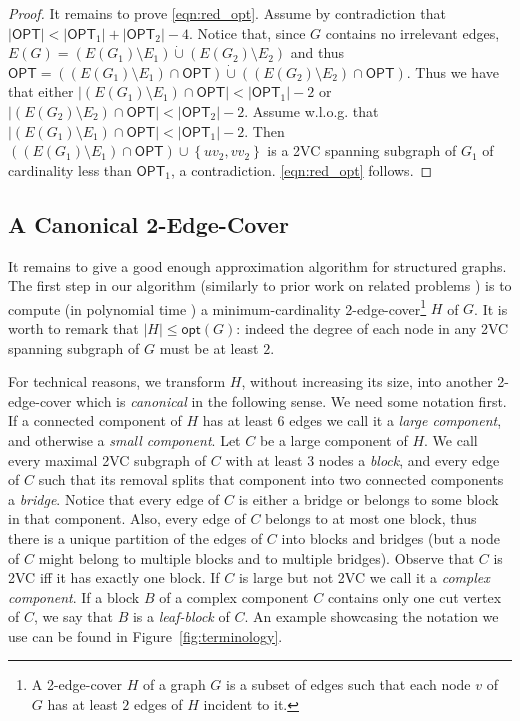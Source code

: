 \documentclass{article}
\newcommand{\OPT}{\mathsf{OPT}}
\newcommand{\opt}{\mathsf{opt}}
\newcommand{\set}[1]{\left\{#1 \right\}}
\begin{document}
\begin{proof}
It remains to prove \eqref{eqn:red_opt}. Assume by contradiction that $|\OPT|< |\OPT_1| + |\OPT_2| - 4$. Notice that, since $G$ contains no irrelevant edges, $E(G)=(E(G_1)\setminus E_1)\dot\cup (E(G_2)\setminus E_2)$ and thus $\OPT=((E(G_1)\setminus E_1)\cap \OPT)\dot\cup((E(G_2)\setminus E_2)\cap\OPT)$. Thus we have that either $|(E(G_1)\setminus E_1)\cap\OPT|<|\OPT_1|-2$ or $|(E(G_2)\setminus E_2)\cap\OPT|<|\OPT_2|-2$. Assume w.l.o.g. that $|(E(G_1)\setminus E_1)\cap\OPT|<|\OPT_1|-2$. Then $((E(G_1)\setminus E_1)\cap\OPT)\cup\set{uv_2,vv_2}$ is a 2VC spanning subgraph of $G_1$ of cardinality less than $\OPT_1$, a contradiction. \eqref{eqn:red_opt} follows.
\end{proof}

\subsection{A Canonical 2-Edge-Cover}
\label{sec:overview:canonical}

It remains to give a good enough approximation algorithm for structured graphs. The first step in our algorithm (similarly to prior work on related problems \cite{CDGKN20,GGJ23,HVV19}) is to compute (in polynomial time \cite[Chapter~30]{S03}) a minimum-cardinality 2-edge-cover\footnote{A 2-edge-cover $H$ of a graph $G$ is a subset of edges such that each node $v$ of $G$ has at least $2$ edges of $H$ incident to it.} $H$ of $G$. It is worth to remark that $|H|\leq \opt(G)$: indeed the degree of each node in any 2VC spanning subgraph of $G$ must be at least $2$. 

For technical reasons, we transform $H$, without increasing its size, into another 2-edge-cover which is \emph{canonical} in the following sense. We need some notation first. If a connected component of $H$ has at least $6$ edges we call it a \emph{large component}, and otherwise a \emph{small component}. Let $C$ be a large component of $H$. We call every maximal 2VC subgraph of $C$ with at least $3$ nodes a \emph{block}, and every edge of $C$ such that its removal splits that component into two connected components a \emph{bridge}. Notice that every edge of $C$ is either a bridge or belongs to some block in that component. Also, every edge of $C$ belongs to at most one block, thus there is a unique partition of the edges of $C$ into blocks and bridges (but a node of $C$ might belong to multiple blocks and to multiple bridges). Observe that $C$ is 2VC iff it has exactly one block. If $C$ is large but not 2VC we call it a \emph{complex component}. If a block $B$ of a complex component $C$ contains only one cut vertex of $C$, we say that $B$ is a \emph{leaf-block} of $C$. An example showcasing the notation we use can be found in Figure~\ref{fig:terminology}.
\end{document}
